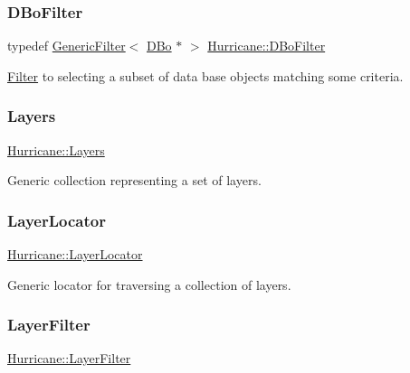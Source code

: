 \subsubsection{\texorpdfstring{D\+Bo\+Filter}{DBoFilter}}
{\footnotesize\ttfamily typedef \mbox{\hyperlink{classHurricane_1_1GenericFilter}{Generic\+Filter}}$<$ \mbox{\hyperlink{classHurricane_1_1DBo}{D\+Bo}} $\ast$ $>$ \mbox{\hyperlink{namespaceHurricane_a2af87173f0c45c5dc1f504d3ea2317d9}{Hurricane\+::\+D\+Bo\+Filter}}}

\mbox{\hyperlink{classHurricane_1_1Filter}{Filter}} to selecting a subset of data base objects matching some criteria. \mbox{\label{namespaceHurricane_a7b7200a36ab7ce8a157ddbe78b625f38}} 
\subsubsection{\texorpdfstring{Layers}{Layers}}
{\footnotesize\ttfamily \mbox{\hyperlink{namespaceHurricane_a7b7200a36ab7ce8a157ddbe78b625f38}{Hurricane\+::\+Layers}}}

Generic collection representing a set of layers. \mbox{\label{namespaceHurricane_a91a93ea29be3e6658d72f9bee0da8c7b}} 
\subsubsection{\texorpdfstring{Layer\+Locator}{LayerLocator}}
{\footnotesize\ttfamily \mbox{\hyperlink{namespaceHurricane_a91a93ea29be3e6658d72f9bee0da8c7b}{Hurricane\+::\+Layer\+Locator}}}

Generic locator for traversing a collection of layers. \mbox{\label{namespaceHurricane_a150e0e72c5c5609e0feb3311fa5bc127}} 
\subsubsection{\texorpdfstring{Layer\+Filter}{LayerFilter}}
{\footnotesize\ttfamily \mbox{\hyperlink{namespaceHurricane_a150e0e72c5c5609e0feb3311fa5bc127}{Hurricane\+::\+Layer\+Filter}}}

